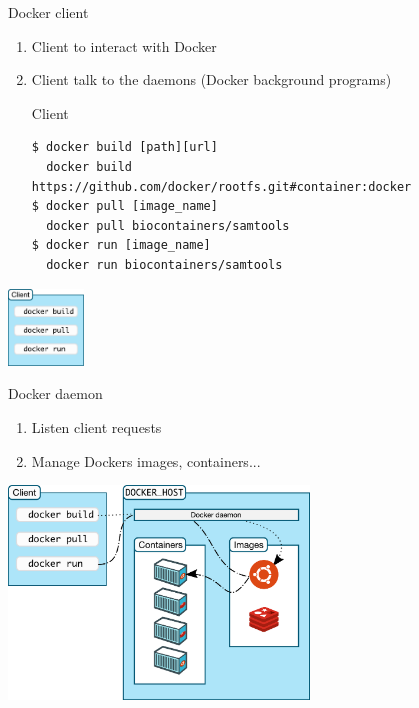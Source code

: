 \begin{frame}[fragile]{Docker client}
\begin{enumerate}
\item<1-> Client to interact with Docker
\item<2-> Client talk to the daemons (Docker background programs)
\begin{block}{Client}
\begin{verbatim}
$ docker build [path][url] 
  docker build https://github.com/docker/rootfs.git#container:docker
$ docker pull [image_name]
  docker pull biocontainers/samtools
$ docker run [image_name]
  docker run biocontainers/samtools
\end{verbatim}
\end{block}
\end{enumerate}

\begin{center}
\includegraphics[width=0.15\textwidth]{images/docker_arch_1.pdf}
\end{center}
\end{frame}

\begin{frame}[<+->]{Docker daemon}
\begin{enumerate}
\item Listen client requests
\item Manage Dockers images, containers...
\end{enumerate}
\centering\includegraphics[width=0.6\textwidth]{images/docker_arch_2.pdf}
\end{frame}

